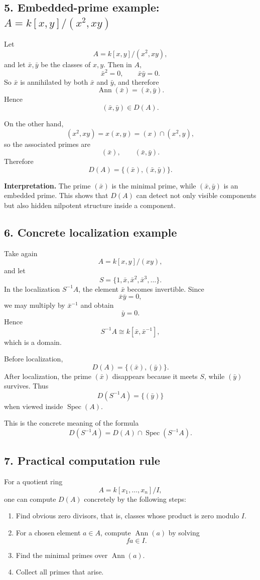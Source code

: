 \documentclass[12pt,a4paper,oneside]{report}
\DeclareMathOperator{\Spec}{Spec}
\DeclareMathOperator{\Ann}{Ann}
\theoremstyle{notespace}
\begin{document}
\subsection{5. Embedded-prime example: \(A=k[x,y]/(x^2,xy)\)}

Let
\[
A=k[x,y]/(x^2,xy),
\]
and let \(\bar x,\bar y\) be the classes of \(x,y\). Then in \(A\),
\[
\bar x^2=0,\qquad \bar x\bar y=0.
\]
So \(\bar x\) is annihilated by both \(\bar x\) and \(\bar y\), and therefore
\[
\Ann(\bar x)=(\bar x,\bar y).
\]
Hence
\[
(\bar x,\bar y)\in D(A).
\]

On the other hand,
\[
(x^2,xy)=x(x,y)=(x)\cap(x^2,y),
\]
so the associated primes are
\[
(\bar x),\qquad (\bar x,\bar y).
\]
Therefore
\[
D(A)=\{(\bar x),(\bar x,\bar y)\}.
\]

\medskip

\noindent
\textbf{Interpretation.}
The prime \((\bar x)\) is the minimal prime, while \((\bar x,\bar y)\) is an embedded prime. This shows that \(D(A)\) can detect not only visible components but also hidden nilpotent structure inside a component.

\subsection{6. Concrete localization example}

Take again
\[
A=k[x,y]/(xy),
\]
and let
\[
S=\{1,\bar x,\bar x^2,\bar x^3,\dots\}.
\]
In the localization \(S^{-1}A\), the element \(\bar x\) becomes invertible. Since
\[
\bar x\bar y=0,
\]
we may multiply by \(\bar x^{-1}\) and obtain
\[
\bar y=0.
\]
Hence
\[
S^{-1}A\cong k[\bar x,\bar x^{-1}],
\]
which is a domain.

Before localization,
\[
D(A)=\{(\bar x),(\bar y)\}.
\]
After localization, the prime \((\bar x)\) disappears because it meets \(S\), while \((\bar y)\) survives. Thus
\[
D(S^{-1}A)=\{(\bar y)\}
\]
when viewed inside \(\Spec(A)\).

This is the concrete meaning of the formula
\[
D(S^{-1}A)=D(A)\cap \Spec(S^{-1}A).
\]

\subsection{7. Practical computation rule}

For a quotient ring
\[
A=k[x_1,\dots,x_n]/I,
\]
one can compute \(D(A)\) concretely by the following steps:
\begin{enumerate}
	\item Find obvious zero divisors, that is, classes whose product is zero modulo \(I\).
	\item For a chosen element \(a\in A\), compute \(\Ann(a)\) by solving
	\[
	fa\in I.
	\]
	\item Find the minimal primes over \(\Ann(a)\).
	\item Collect all primes that arise.
\end{enumerate}
\end{document}
